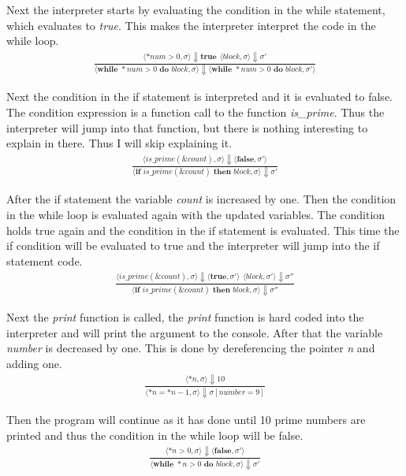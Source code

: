 \documentclass[12pt]{article}
\begin{document}
	Next the interpreter starts by evaluating the condition in the while statement, which evaluates to \emph{true}. This makes the interpreter interpret the code in the while loop.
	\begin{align*}
		\frac{\langle *num > 0, \sigma \rangle\Downarrow \textbf{true} \ \
		\langle block, \sigma \rangle\Downarrow \sigma'}
		{\langle \textbf{while } *num > 0 \textbf{ do } block, \sigma \rangle\Downarrow \langle \textbf{while } *num > 0 \textbf{ do } block, \sigma' \rangle}
	\end{align*}

	Next the condition in the if statement is interpreted and it is evaluated to false. The condition expression is a function call to the function \emph{is\_prime}. Thus the interpreter will jump into that function, but there is nothing interesting to explain in there. Thus I will skip explaining it.
	\begin{align*}
		\frac{\langle is\_prime(\&count), \sigma \rangle\Downarrow \langle \textbf{false}, \sigma' \rangle}
		{\langle \textbf{if } is\_prime(\&count) \textbf{ then } block, \sigma \rangle\Downarrow \sigma'}
	\end{align*}

	After the if statement the variable \emph{count} is increased by one. Then the condition in the while loop is evaluated again with the updated variables. The condition holds true again and the condition in the if statement is evaluated. This time the if condition will be evaluated to true and the interpreter will jump into the if statement code.
	\begin{align*}
		\frac{\langle is\_prime(\&count), \sigma \rangle\Downarrow \langle \textbf{true}, \sigma' \rangle \ \
		\langle block, \sigma' \rangle\Downarrow \sigma''}
		{\langle \textbf{if } is\_prime(\&count) \textbf{ then } block, \sigma \rangle\Downarrow \sigma''}
	\end{align*}

	Next the \emph{print} function is called, the \emph{print} function is hard coded into the interpreter and will print the argument to the console. After that the variable \emph{number} is decreased by one. This is done by dereferencing the pointer \emph{n} and adding one.
	\begin{align*}
		\frac{\langle *n, \sigma \rangle\Downarrow 10}
		{\langle *n = *n - 1, \sigma \rangle\Downarrow \sigma[number = 9]}
	\end{align*}
	
	Then the program will continue as it has done until 10 prime numbers are printed and thus the condition in the while loop will be false.
	\begin{align*}
		\frac{\langle *n > 0, \sigma \rangle\Downarrow \langle \textbf{false}, \sigma' \rangle}
		{\langle \textbf{while } *n > 0 \textbf{ do } block, \sigma \rangle\Downarrow \sigma'}
	\end{align*}
\end{document}
